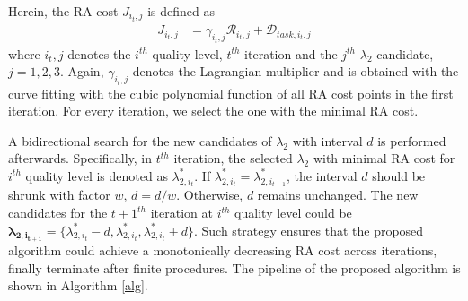 \documentclass[transmag]{IEEEtran}
\begin{document}
Herein, the RA cost $J_{i_{t},j}$ is defined as 
\begin{equation}
\begin{aligned}
    J_{i_{t},j}&=\gamma_{i_{t},j}\mathcal{R}_{i_{t},j}+\mathcal{D}_{task, i_{t},j}
\end{aligned}
\label{racost}
\end{equation}
where $i_{t},j$ denotes the $i^{th}$ quality level, $t^{th}$ iteration and the $j^{th}$ $\lambda_{2}$ candidate, $j=1,2,3$.
Again, \(\gamma_{i_{t},j}\) denotes the Lagrangian multiplier and is obtained with the curve fitting with the cubic polynomial function of all RA cost points in the first iteration. For every iteration, we select the one with the minimal RA cost. 

A bidirectional search for the new candidates of $\lambda_{2}$ with interval $d$ is performed afterwards. Specifically, in $t^{th}$ iteration, the selected $\lambda_{2}$ with minimal RA cost for $i^{th}$ quality level is denoted as $\lambda_{2,i_{t}}^{*}$. If $\lambda_{2,i_{t}}^{*}=\lambda_{2,i_{t-1}}^{*}$, the interval $d$ should be shrunk with factor $w$, $d=d/w$. Otherwise, $d$ remains unchanged. The new candidates for the $t+1^{th}$ iteration at $i^{th}$ quality level could be $\bm{\lambda_{2,i_{t+1}}}=\{\lambda_{2,i_{t}}^{*}-d, \lambda_{2,i_{t}}^{*}, \lambda_{2,i_{t}}^{*}+d\}$. 
Such strategy ensures that 
the proposed algorithm could achieve a monotonically decreasing RA cost across iterations, finally terminate after finite procedures. 
The pipeline of the proposed algorithm is shown in Algorithm \ref{alg}.
\end{document}
